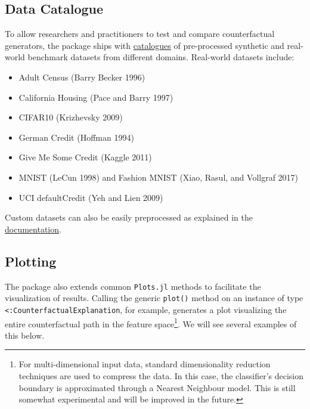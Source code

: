 \documentclass{juliacon}
\providecommand{\tightlist}{%
  \setlength{\itemsep}{0pt}\setlength{\parskip}{0pt}}\usepackage{longtable,booktabs,array}
\begin{document}
\twocolumn

\hypertarget{data-catalogue}{%
\subsection{Data Catalogue}\label{data-catalogue}}

To allow researchers and practitioners to test and compare
counterfactual generators, the package ships with
\href{https://juliatrustworthyai.github.io/CounterfactualExplanations.jl/v0.1/tutorials/data_catalogue/}{catalogues}
of pre-processed synthetic and real-world benchmark datasets from
different domains. Real-world datasets include:

\begin{itemize}
\tightlist
\item
  Adult Census (Barry Becker 1996)
\item
  California Housing (Pace and Barry 1997)
\item
  CIFAR10 (Krizhevsky 2009)
\item
  German Credit (Hoffman 1994)
\item
  Give Me Some Credit (Kaggle 2011)
\item
  MNIST (LeCun 1998) and Fashion MNIST (Xiao, Rasul, and Vollgraf 2017)
\item
  UCI defaultCredit (Yeh and Lien 2009)
\end{itemize}

Custom datasets can also be easily preprocessed as explained in the
\href{https://juliatrustworthyai.github.io/CounterfactualExplanations.jl/v0.1/tutorials/data_preprocessing/}{documentation}.

\hypertarget{plotting}{%
\subsection{Plotting}\label{plotting}}

The package also extends common \texttt{Plots.jl} methods to facilitate
the visualization of results. Calling the generic \texttt{plot()} method
on an instance of type \texttt{\textless{}:CounterfactualExplanation},
for example, generates a plot visualizing the entire counterfactual path
in the feature space\footnote{For multi-dimensional input data, standard
  dimensionality reduction techniques are used to compress the data. In
  this case, the classifier's decision boundary is approximated through
  a Nearest Neighbour model. This is still somewhat experimental and
  will be improved in the future.}. We will see several examples of this
below.
\end{document}

